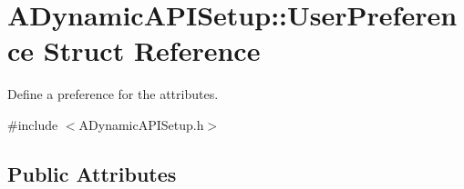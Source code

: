 \hypertarget{structADynamicAPISetup_1_1UserPreference}{}\section{A\+Dynamic\+A\+P\+I\+Setup\+:\+:User\+Preference Struct Reference}
\label{structADynamicAPISetup_1_1UserPreference}


Define a preference for the attributes.  




{\ttfamily \#include $<$A\+Dynamic\+A\+P\+I\+Setup.\+h$>$}

\subsection*{Public Attributes}
